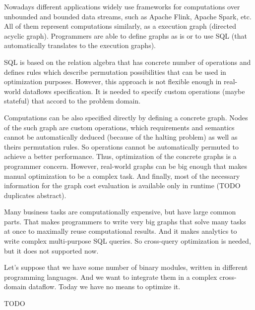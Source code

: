 Nowadays different applications widely use frameworks for computations over unbounded and bounded data streams, such as Apache Flink, Apache Spark, etc.
All of them represent computations similarly, as a execution graph (directed acyclic graph).
Programmers are able to define graphs as is or to use SQL (that automatically translates to the execution graphs).

SQL is based on the relation algebra that has concrete number of operations and defines rules which describe permutation possibilities that can be used in optimization purposes.
However, this approach is not flexible enough in real-world dataflows specification.
It is needed to specify custom operations (maybe stateful) that accord to the problem domain.

Computations can be also specified directly by defining a concrete graph.
Nodes of the such graph are custom operations, which requirements and semantics cannot be automatically deduced (because of the halting problem) as well as theirs permutation rules.
So operations cannot be automatically permuted to achieve a better performance.
Thus, optimization of the concrete graphs is a programmer concern.
However, real-world graphs can be big enough that makes manual optimization to be a complex task.
And finally, most of the necessary information for the graph cost evaluation is available only in runtime (TODO duplicates abstract).

Many business tasks are computationally expensive, but have large common parts.
That makes programmers to write very big graphs that solve many tasks at once to maximally reuse computational results.
And it makes analytics to write complex multi-purpose SQL queries.
So cross-query optimization is needed, but it does not supported now.

Let's suppose that we have some number of binary modules, written in different programming languages.
And we want to integrate them in a complex cross-domain dataflow.
Today we have no means to optimize it.

TODO
